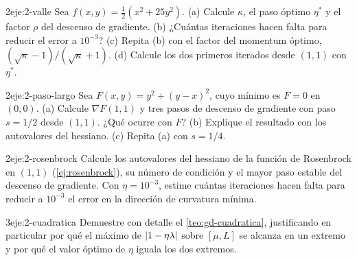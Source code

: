 \begin{ejercicio}{2}{eje:2-valle}
Sea $f(x,y)=\tfrac12(x^{2}+25y^{2})$. (a) Calcule $\kappa$, el paso óptimo $\eta^{\ast}$ y el factor $\rho$ del descenso de gradiente. (b) ¿Cuántas iteraciones hacen falta para reducir el error a $10^{-3}$? (c) Repita (b) con el factor del momentum óptimo, $(\sqrt\kappa-1)/(\sqrt\kappa+1)$. (d) Calcule los dos primeros iterados desde $(1,1)$ con $\eta^{\ast}$.
\end{ejercicio}

\begin{ejercicio}{2}{eje:2-paso-largo}
Sea $F(x,y)=y^{2}+(y-x)^{2}$, cuyo mínimo es $F=0$ en $(0,0)$. (a) Calcule $\nabla F(1,1)$ y tres pasos de descenso de gradiente con paso $s=1/2$ desde $(1,1)$. ¿Qué ocurre con $F$? (b) Explique el resultado con los autovalores del hessiano. (c) Repita (a) con $s=1/4$.
\end{ejercicio}

\begin{ejercicio}{2}{eje:2-rosenbrock}
Calcule los autovalores del hessiano de la función de Rosenbrock en $(1,1)$ (\cref{ej:rosenbrock}), su número de condición y el mayor paso estable del descenso de gradiente. Con $\eta=10^{-3}$, estime cuántas iteraciones hacen falta para reducir a $10^{-3}$ el error en la dirección de curvatura mínima.
\end{ejercicio}

\begin{ejercicio}{3}{eje:2-cuadratica}
Demuestre con detalle el \cref{teo:gd-cuadratica}, justificando en particular por qué el máximo de $\lvert1-\eta\lambda\rvert$ sobre $[\mu,L]$ se alcanza en un extremo y por qué el valor óptimo de $\eta$ iguala los dos extremos.
\end{ejercicio}
